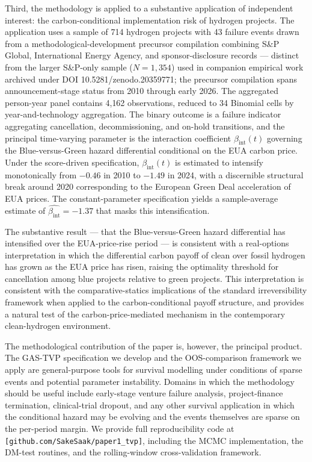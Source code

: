 \documentclass[12pt,a4paper]{article}
\newcommand{\bint}{\beta_{\text{int}}}
\theoremstyle{plain}
\theoremstyle{definition}
\begin{document}
Third, the methodology is applied to a substantive application of independent interest: the carbon-conditional implementation risk of hydrogen projects. The application uses a sample of 714 hydrogen projects with 43 failure events drawn from a methodological-development precursor compilation combining S\&P Global, International Energy Agency, and sponsor-disclosure records --- distinct from the larger S\&P-only sample ($N = 1{,}354$) used in companion empirical work archived under DOI 10.5281/zenodo.20359771; the precursor compilation spans announcement-stage status from 2010 through early 2026. The aggregated person-year panel contains 4{,}162 observations, reduced to 34 Binomial cells by year-and-technology aggregation. The binary outcome is a failure indicator aggregating cancellation, decommissioning, and on-hold transitions, and the principal time-varying parameter is the interaction coefficient $\bint(t)$ governing the Blue-versus-Green hazard differential conditional on the EUA carbon price. Under the score-driven specification, $\bint(t)$ is estimated to intensify monotonically from $-0.46$ in 2010 to $-1.49$ in 2024, with a discernible structural break around 2020 corresponding to the European Green Deal acceleration of EUA prices. The constant-parameter specification yields a sample-average estimate of $\hat{\bint} = -1.37$ that masks this intensification.

The substantive result --- that the Blue-versus-Green hazard differential has intensified over the EUA-price-rise period --- is consistent with a real-options interpretation in which the differential carbon payoff of clean over fossil hydrogen has grown as the EUA price has risen, raising the optimality threshold for cancellation among blue projects relative to green projects. This interpretation is consistent with the comparative-statics implications of the standard \cite{dixit1994investment} irreversibility framework when applied to the carbon-conditional payoff structure, and provides a natural test of the carbon-price-mediated mechanism in the contemporary clean-hydrogen environment.

The methodological contribution of the paper is, however, the principal product. The GAS-TVP specification we develop and the OOS-comparison framework we apply are general-purpose tools for survival modelling under conditions of sparse events and potential parameter instability. Domains in which the methodology should be useful include early-stage venture failure analysis, project-finance termination, clinical-trial dropout, and any other survival application in which the conditional hazard may be evolving and the events themselves are sparse on the per-period margin. We provide full reproducibility code at \texttt{[github.com/SakeSaak/paper1\_tvp]}, including the MCMC implementation, the DM-test routines, and the rolling-window cross-validation framework.
\end{document}
